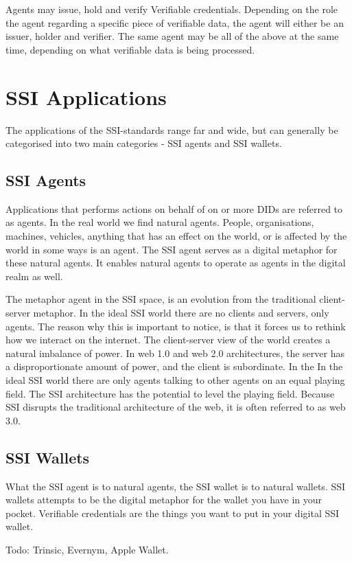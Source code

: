 Agents may issue, hold and verify Verifiable credentials. Depending on
the role the agent regarding a specific piece of verifiable data, the
agent will either be an issuer, holder and verifier. The same agent may
be all of the above at the same time, depending on what verifiable data
is being processed.





\hypertarget{ssi-applications}{%
\section{SSI Applications}\label{ssi-applications}}

The applications of the SSI-standards range far and wide, but can
generally be categorised into two main categories - SSI agents and SSI
wallets.

\hypertarget{ssi-agents}{%
\subsection{SSI Agents}\label{ssi-agents}}

Applications that performs actions on behalf of on or more DIDs are
referred to as agents. In the real world we find natural agents. People,
organisations, machines, vehicles, anything that has an effect on the
world, or is affected by the world in some ways is an agent. The SSI
agent serves as a digital metaphor for these natural agents. It enables
natural agents to operate as agents in the digital realm as well.

The metaphor agent in the SSI space, is an evolution from the
traditional client-server metaphor. In the ideal SSI world there are no
clients and servers, only agents. The reason why this is important to
notice, is that it forces us to rethink how we interact on the internet.
The client-server view of the world creates a natural imbalance of
power. In web 1.0 and web 2.0 architectures, the server has a
disproportionate amount of power, and the client is subordinate. In the
In the ideal SSI world there are only agents talking to other agents on
an equal playing field. The SSI architecture has the potential to level
the playing field. Because SSI disrupts the traditional architecture of
the web, it is often referred to as web 3.0.

\hypertarget{ssi-wallets}{%
\subsection{SSI Wallets}\label{ssi-wallets}}

What the SSI agent is to natural agents, the SSI wallet is to natural
wallets. SSI wallets attempts to be the digital metaphor for the wallet
you have in your pocket. Verifiable credentials are the things you want
to put in your digital SSI wallet.

Todo: Trinsic, Evernym, Apple Wallet.
